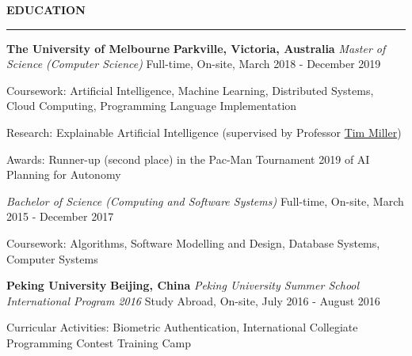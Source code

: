 \documentclass{cv}
\begin{document}

\textbf{\uppercase{Education}}
\sectionlineskip
\hrule height 0.6pt
\begin{list}{}{\setlength{\leftmargin}{0pt}}
\item
    \textbf{The University of Melbourne} \hfill \textbf{Parkville, Victoria, Australia}%
    \vspace{1.0pt} \newline
    {\textit{Master of Science (Computer Science)}} \hfill {Full-time, On-site, March 2018 - December 2019}%
    \begin{list}{\raisebox{2.0pt}{\tiny$\bullet$}\space}{\setlength{\leftmargin}{11.2pt}}
        \itemsep -5.0pt \vspace{-4.0pt}
        \item Coursework: Artificial Intelligence, Machine Learning, Distributed Systems, Cloud Computing, Programming Language Implementation
        \item Research: Explainable Artificial Intelligence (supervised by Professor \href{https://eecs.uq.edu.au/profile/9477/tim-miller}{Tim Miller})
        \item Awards: Runner-up (second place) in the Pac-Man Tournament 2019 of AI Planning for Autonomy
    \end{list}
    \vspace{-3.0pt}
    {\textit{Bachelor of Science (Computing and Software Systems)}} \hfill {Full-time, On-site, March 2015 - December 2017}%
    \begin{list}{\raisebox{2.0pt}{\tiny$\bullet$}\space}{\setlength{\leftmargin}{11.2pt}}
        \itemsep -5.0pt \vspace{-4.0pt}
        \item Coursework: Algorithms, Software Modelling and Design, Database Systems, Computer Systems
    \end{list}
\item
    \textbf{Peking University} \hfill \textbf{Beijing, China}%
    \vspace{1.0pt} \newline 
    {\textit{Peking University Summer School International Program 2016}} \hfill {Study Abroad, On-site, July 2016 - August 2016}%
    \begin{list}{\raisebox{2.0pt}{\tiny$\bullet$}\space}{\setlength{\leftmargin}{11.2pt}}
        \itemsep -5.0pt \vspace{-4.0pt}
        \item Curricular Activities: Biometric Authentication, International Collegiate Programming Contest Training Camp
    \end{list}
\end{list}
\end{document}
